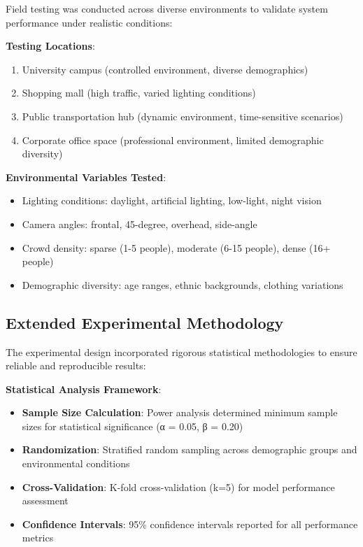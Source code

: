 \documentclass[12pt,a4paper]{article}
\begin{document}
Field testing was conducted across diverse environments to validate system performance under realistic conditions:

\textbf{Testing Locations}:
\begin{enumerate}
    \item University campus (controlled environment, diverse demographics)
    \item Shopping mall (high traffic, varied lighting conditions)
    \item Public transportation hub (dynamic environment, time-sensitive scenarios)
    \item Corporate office space (professional environment, limited demographic diversity)
\end{enumerate}

\textbf{Environmental Variables Tested}:
\begin{itemize}
    \item Lighting conditions: daylight, artificial lighting, low-light, night vision
    \item Camera angles: frontal, 45-degree, overhead, side-angle
    \item Crowd density: sparse (1-5 people), moderate (6-15 people), dense (16+ people)
    \item Demographic diversity: age ranges, ethnic backgrounds, clothing variations
\end{itemize}

\subsection{Extended Experimental Methodology}

The experimental design incorporated rigorous statistical methodologies to ensure reliable and reproducible results:

\textbf{Statistical Analysis Framework}:
\begin{itemize}
    \item \textbf{Sample Size Calculation}: Power analysis determined minimum sample sizes for statistical significance (α = 0.05, β = 0.20)
    \item \textbf{Randomization}: Stratified random sampling across demographic groups and environmental conditions
    \item \textbf{Cross-Validation}: K-fold cross-validation (k=5) for model performance assessment
    \item \textbf{Confidence Intervals}: 95\% confidence intervals reported for all performance metrics
\end{itemize}
\end{document}
